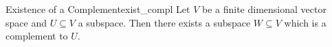 \begin{proposition}{Existence of a Complement}{exist_compl}
	Let $V$ be a finite dimensional vector space and $U \subseteq V$ a subspace. Then there exists a subspace $W \subseteq V$ which is a complement to $U$.
\end{proposition}









































